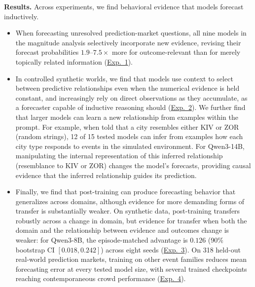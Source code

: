 \documentclass{article}
\begin{document}
\noindent\textbf{Results.}
Across experiments, we find behavioral evidence that models forecast inductively.
\vspace{-1.5mm}
\begin{itemize}[
    leftmargin=3.5mm,
    itemsep=2pt,
    parsep=0pt,
    topsep=3pt
]
\item When forecasting unresolved prediction-market questions, all nine models in the magnitude analysis selectively incorporate new evidence, revising their forecast probabilities $1.9$–$7.5\times$ more for outcome-relevant than for merely topically related information (\hyperref[sec:exp1]{Exp.~1}).
\item In controlled synthetic worlds, we find that models use context to select between predictive relationships even when the numerical evidence is held constant, and increasingly rely on direct observations as they accumulate, as a forecaster capable of inductive reasoning should (\hyperref[sec:exp2]{Exp.~2}).
We further find that larger models can learn a new relationship from examples within the prompt. For example, when told that a city resembles either KIV or ZOR (random strings), 12 of 15 tested models can infer from examples how each city type responds to events in the simulated environment.
For Qwen3-14B, manipulating the internal representation of this inferred relationship (resemblance to KIV or ZOR) changes the model's forecasts, providing causal evidence that the inferred relationship guides its prediction.
\item Finally, we find that post-training can produce forecasting behavior that generalizes across domains, although evidence for more demanding forms of transfer is substantially weaker.
On synthetic data, post-training transfers robustly across a change in domain, but evidence for transfer when both the domain and the relationship between evidence and outcomes change is weaker: for Qwen3-8B, the episode-matched advantage is $0.126$ (90\% bootstrap CI $[0.018, 0.242]$) across eight seeds (\hyperref[sec:exp3]{Exp.~3}).
On 318 held-out real-world prediction markets, training on other event families reduces mean forecasting error at every tested model size, with several trained checkpoints reaching contemporaneous crowd performance (\hyperref[sec:exp4]{Exp.~4}).
\end{itemize}
\end{document}
